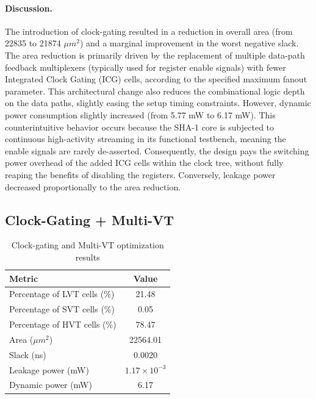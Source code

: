 \documentclass[11pt,a4paper]{article}
\begin{document}
\paragraph{Discussion.} 
The introduction of clock-gating resulted in a reduction in overall area (from 22835 to 21874 $\mu m^2$) and a marginal improvement in the worst negative slack. The area reduction is primarily driven by the replacement of multiple data-path feedback multiplexers (typically used for register enable signals) with fewer Integrated Clock Gating (ICG) cells, according to the specified maximum fanout parameter. This architectural change also reduces the combinational logic depth on the data paths, slightly easing the setup timing constraints.
However, dynamic power consumption slightly increased (from 5.77 mW to 6.17 mW). This counterintuitive behavior occurs because the SHA-1 core is subjected to continuous high-activity streaming in its functional testbench, meaning the enable signals are rarely de-asserted. Consequently, the design pays the switching power overhead of the added ICG cells within the clock tree, without fully reaping the benefits of disabling the registers. Conversely, leakage power decreased proportionally to the area reduction.

\subsection{Clock-Gating + Multi-VT}
\begin{table}[h]
\centering
\caption{Clock-gating and Multi-VT optimization results}
\label{tab:multivt}
\begin{tabular}{lc}
\toprule
\textbf{Metric} & \textbf{Value} \\
\midrule
Percentage of LVT cells (\%) & 21.48 \\
Percentage of SVT cells (\%) & 0.05 \\
Percentage of HVT cells (\%) & 78.47 \\
Area ($\mu m^2$) & 22564.01 \\
Slack (ns) & 0.0020 \\
Leakage power (mW) & $1.17 \times 10^{-3}$ \\
Dynamic power (mW) & 6.17 \\
\bottomrule
\end{tabular}
\end{table}
\end{document}
